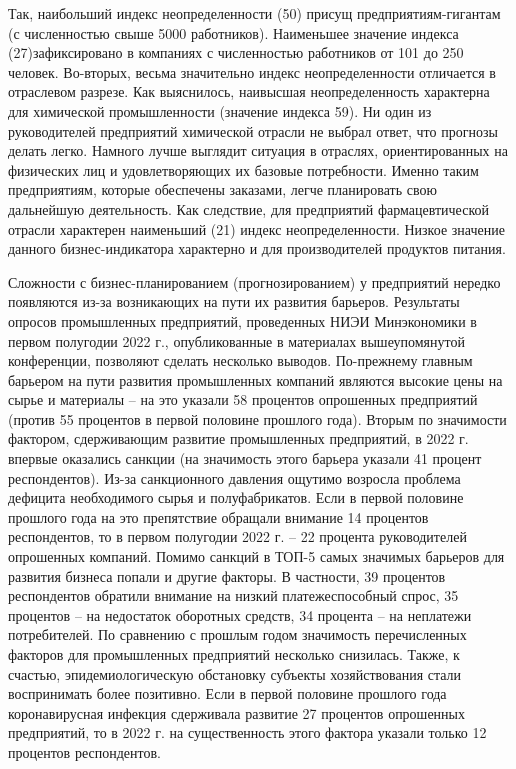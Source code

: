 \documentclass[14pt,a4paper]{article}
\begin{document}
    Так, наибольший индекс неопределенности (50) присущ предприятиям-гигантам (с численностью свыше 5000 работников).
    Наименьшее значение индекса (27)зафиксировано в компаниях с численностью работников от 101 до 250 человек.
    Во-вторых, весьма значительно индекс неопределенности отличается в отраслевом разрезе.
    Как выяснилось, наивысшая неопределенность характерна для химической промышленности (значение индекса 59).
    Ни один из руководителей предприятий химической отрасли не выбрал ответ, что прогнозы делать легко.
    Намного лучше выглядит ситуация в отраслях, ориентированных на физических лиц и удовлетворяющих их базовые потребности.
    Именно таким предприятиям, которые обеспечены заказами, легче планировать свою дальнейшую деятельность.
    Как следствие, для предприятий фармацевтической отрасли характерен наименьший (21) индекс неопределенности.
    Низкое значение данного бизнес-индикатора характерно и для производителей продуктов питания.
    \par
    Сложности с бизнес-планированием (прогнозированием) у предприятий нередко появляются из-за возникающих на пути их развития барьеров.
    Результаты опросов промышленных предприятий, проведенных НИЭИ Минэкономики в первом полугодии 2022 г., опубликованные в материалах вышеупомянутой конференции, позволяют сделать несколько выводов.
    По-прежнему главным барьером на пути развития промышленных компаний являются высокие цены на сырье и материалы – на это указали 58 процентов опрошенных предприятий (против 55 процентов в первой половине прошлого года).
    Вторым по значимости фактором, сдерживающим развитие промышленных предприятий, в 2022 г. впервые оказались санкции (на значимость этого барьера указали 41 процент респондентов).
    Из-за санкционного давления ощутимо возросла проблема дефицита необходимого сырья и полуфабрикатов.
    Если в первой половине прошлого года на это препятствие обращали внимание 14 процентов респондентов, то в первом полугодии 2022 г. – 22 процента руководителей опрошенных компаний.
    Помимо санкций в ТОП-5 самых значимых барьеров для развития бизнеса попали и другие факторы.
    В частности, 39 процентов респондентов обратили внимание на низкий платежеспособный спрос, 35 процентов – на недостаток оборотных средств, 34 процента – на неплатежи потребителей.
    По сравнению с прошлым годом значимость перечисленных факторов для промышленных предприятий несколько снизилась.
    Также, к счастью, эпидемиологическую обстановку субъекты хозяйствования стали воспринимать более позитивно.
    Если в первой половине прошлого года коронавирусная инфекция сдерживала развитие 27 процентов опрошенных предприятий, то в 2022 г. на существенность этого фактора указали только 12 процентов респондентов.
\end{document}
